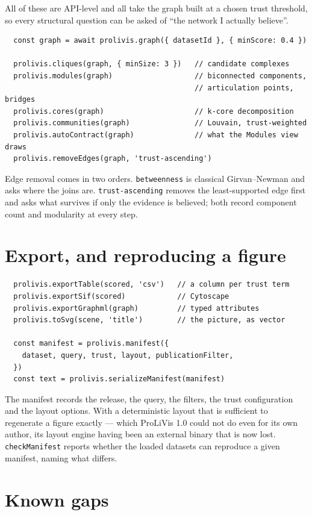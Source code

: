\documentclass[11pt,a4paper]{article}
\begin{document}
All of these are API-level and all take the graph built at a chosen trust threshold, so
every structural question can be asked of ``the network I actually believe''.

\begin{verbatim}
  const graph = await prolivis.graph({ datasetId }, { minScore: 0.4 })

  prolivis.cliques(graph, { minSize: 3 })   // candidate complexes
  prolivis.modules(graph)                   // biconnected components,
                                            // articulation points, bridges
  prolivis.cores(graph)                     // k-core decomposition
  prolivis.communities(graph)               // Louvain, trust-weighted
  prolivis.autoContract(graph)              // what the Modules view draws
  prolivis.removeEdges(graph, 'trust-ascending')
\end{verbatim}

Edge removal comes in two orders. \texttt{betweenness} is classical Girvan--Newman and
asks where the joins are. \texttt{trust-ascending} removes the least-supported edge
first and asks what survives if only the evidence is believed; both record component
count and modularity at every step.

\section{Export, and reproducing a figure}

\begin{verbatim}
  prolivis.exportTable(scored, 'csv')   // a column per trust term
  prolivis.exportSif(scored)            // Cytoscape
  prolivis.exportGraphml(graph)         // typed attributes
  prolivis.toSvg(scene, 'title')        // the picture, as vector

  const manifest = prolivis.manifest({
    dataset, query, trust, layout, publicationFilter,
  })
  const text = prolivis.serializeManifest(manifest)
\end{verbatim}

The manifest records the release, the query, the filters, the trust configuration and
the layout options. With a deterministic layout that is sufficient to regenerate a
figure exactly --- which ProLiVis 1.0 could not do even for its own author, its layout
engine having been an external binary that is now lost. \texttt{checkManifest} reports
whether the loaded datasets can reproduce a given manifest, naming what differs.

\section{Known gaps}
\end{document}
